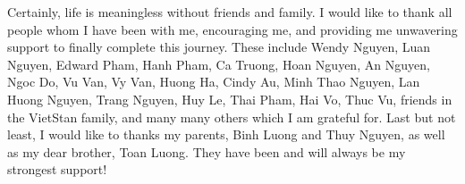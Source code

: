 Certainly, life is meaningless without friends and family. I would like to thank all people whom I have been with me, encouraging me, and providing me unwavering support to finally complete this journey. These include Wendy Nguyen, Luan Nguyen, Edward Pham, Hanh Pham, Ca Truong, Hoan Nguyen, An Nguyen, Ngoc Do, Vu Van, Vy Van, Huong Ha, Cindy Au, Minh Thao Nguyen, Lan Huong Nguyen, Trang Nguyen, Huy Le, Thai Pham, Hai Vo, Thuc Vu, friends in the VietStan family, and many many others which I am grateful for.
Last but not least, I would like to thanks my parents, Binh Luong and Thuy Nguyen, as well as my dear brother, Toan Luong. They have been and will always be my strongest support!

